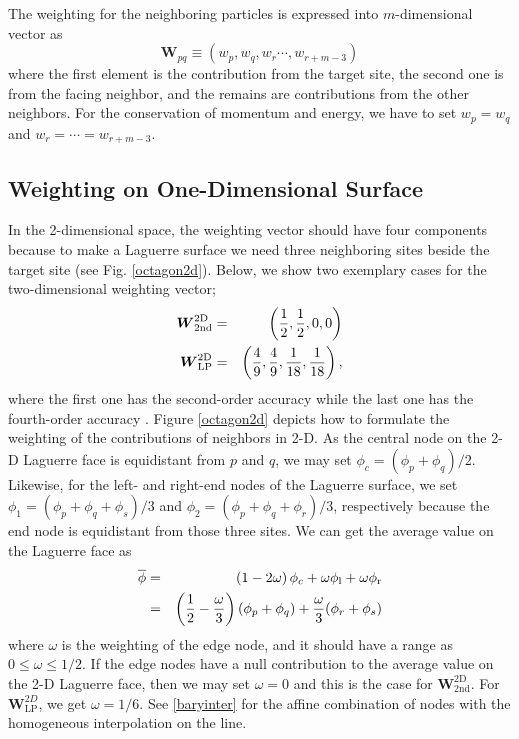 \documentclass[twocolumn]{aastex63}
\begin{document}
The weighting for the neighboring particles is expressed into $m$-dimensional vector as
\begin{equation}
	\boldsymbol{W}_{pq} \equiv (w_p, w_q, w_{r}\cdots, w_{r+m-3})
\end{equation}
where the first element is the contribution from the target site, the second one is from the facing neighbor, and the remains are contributions from the other neighbors.
For the conservation of momentum and energy, we have to set $w_p = w_q$ and $w_r = \cdots = w_{r+m-3}$.


\subsection{Weighting on One-Dimensional Surface}
In the 2-dimensional space, the weighting vector should have four components because to make a Laguerre surface we need three neighboring sites beside the target site (see Fig. \ref{octagon2d}). Below, we show two exemplary cases for the two-dimensional weighting vector; 
\begin{eqnarray}
	\boldsymbol{W}^\text{2D}_\text{2nd} &=& \left({1\over2},{1\over2},0,0\right) \\
	\boldsymbol{W}^\text{2D}_\text{LP} &=& \left({4\over9},{4\over9},{1\over 18}, {1\over 18}\right), 
\end{eqnarray}
where the first one has the second-order accuracy while the last one has the fourth-order accuracy \citep{LILEK1995239}. Figure \ref{octagon2d} depicts how to formulate the weighting of the contributions of neighbors in 2-D. As the central node on the 2-D Laguerre face is equidistant from $p$ and $q$, we may set $\phi_c = (\phi_p +\phi_q)/2$. Likewise, for the left- and right-end nodes of the Laguerre surface, we set $\phi_1 = (\phi_p+\phi_q+\phi_s)/3$ and $\phi_2 = (\phi_p+\phi_q+\phi_r)/3$, respectively because the end node is equidistant from those three sites. We can get the average value on the Laguerre face as 
\begin{eqnarray}
	\overline{\phi} &=& \left(1-{2}\omega\right)\phi_c + {\omega}\phi_\text{l} + {\omega}\phi_\text{r}\\
	&=&  \left({1\over2}-{\omega\over3}\right)(\phi_p+\phi_q) + {\omega\over3}(\phi_r+\phi_s) 
\end{eqnarray}
where  $\omega$ is the weighting of the edge node, and it should have a range as $0\le \omega\le 1/2$. If the edge nodes have a null contribution to the average value on the 2-D Laguerre face, then we may set $\omega=0$ and this is the case for $\boldsymbol{W}_\text{2nd}^\text{2D}$. For $\boldsymbol{W}_\text{LP}^{2D}$, we get $\omega=1/6$.  See \ref{baryinter} for the affine combination of nodes with the homogeneous interpolation on the line.
\end{document}
